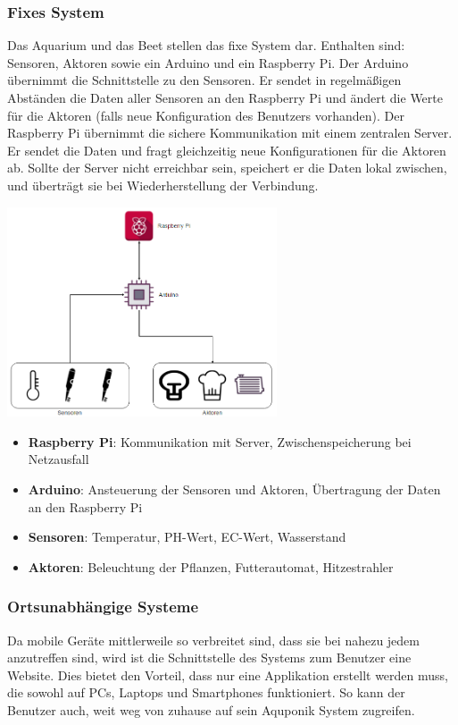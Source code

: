 \documentclass[11pt]{article}
\begin{document}
\subsubsection{Fixes System}
Das Aquarium und das Beet stellen das fixe System dar. Enthalten sind: Sensoren, Aktoren sowie ein Arduino und ein Raspberry Pi. Der Arduino \"ubernimmt die Schnittstelle zu den Sensoren. Er sendet in regelm\"aßigen Abst\"anden die Daten aller Sensoren an den Raspberry Pi und \"andert die Werte f\"ur die Aktoren (falls neue Konfiguration des Benutzers vorhanden). Der Raspberry Pi \"ubernimmt die sichere Kommunikation mit einem zentralen Server. Er sendet die Daten und fragt gleichzeitig neue Konfigurationen f\"ur die Aktoren ab. Sollte der Server nicht erreichbar sein, speichert er die Daten lokal zwischen, und \"ubertr\"agt sie bei Wiederherstellung der Verbindung. 
\begin{center}
	\includegraphics[width=8cm]{fixesSystem}
\end{center}
\vskip1cm
\begin{itemize}
	\item \textbf{Raspberry Pi}: Kommunikation mit Server, Zwischenspeicherung bei Netzausfall 
	\item \textbf{Arduino}: Ansteuerung der Sensoren und Aktoren, \"Ubertragung der Daten an den Raspberry Pi
	\item \textbf{Sensoren}: Temperatur, PH-Wert, EC-Wert, Wasserstand
	\item \textbf{Aktoren}: Beleuchtung der Pflanzen, Futterautomat, Hitzestrahler
\end{itemize}
\subsubsection{Ortsunabh\"angige Systeme}
Da mobile Ger\"ate mittlerweile so verbreitet sind, dass sie bei nahezu jedem anzutreffen sind, wird ist die Schnittstelle des Systems zum Benutzer eine Website. Dies bietet den Vorteil, dass nur eine Applikation erstellt werden muss, die sowohl auf PCs, Laptops und Smartphones funktioniert. So kann der Benutzer auch, weit weg von zuhause auf sein Aquponik System zugreifen. 
\end{document}
